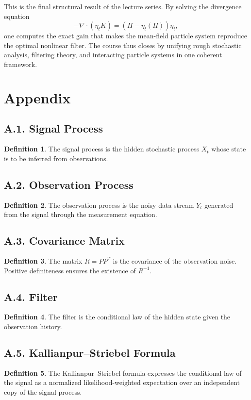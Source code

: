 \documentclass[11pt]{article}
\theoremstyle{definition}
\newtheorem{definition}{Definition}
\theoremstyle{remark}
\begin{document}
This is the final structural result of the lecture series. By solving the divergence equation
\[
-\nabla\cdot(\eta_t K)=(H-\eta_t(H))\eta_t,
\]
one computes the exact gain that makes the mean-field particle system reproduce the optimal nonlinear filter. The course thus closes by unifying rough stochastic analysis, filtering theory, and interacting particle systems in one coherent framework.

\section*{Appendix}

\subsection*{A.1. Signal Process}
\begin{definition}
The signal process is the hidden stochastic process \(X_t\) whose state is to be inferred from observations.
\end{definition}

\subsection*{A.2. Observation Process}
\begin{definition}
The observation process is the noisy data stream \(Y_t\) generated from the signal through the measurement equation.
\end{definition}

\subsection*{A.3. Covariance Matrix}
\begin{definition}
The matrix \(R=PP^T\) is the covariance of the observation noise. Positive definiteness ensures the existence of \(R^{-1}\).
\end{definition}

\subsection*{A.4. Filter}
\begin{definition}
The filter is the conditional law of the hidden state given the observation history.
\end{definition}

\subsection*{A.5. Kallianpur--Striebel Formula}
\begin{definition}
The Kallianpur--Striebel formula expresses the conditional law of the signal as a normalized likelihood-weighted expectation over an independent copy of the signal process.
\end{definition}
\end{document}
